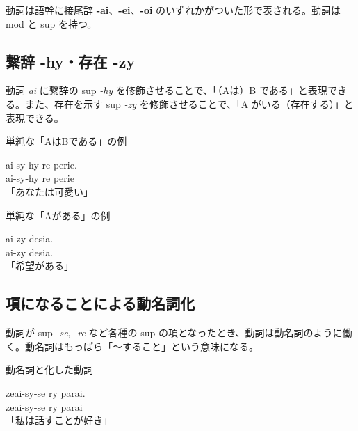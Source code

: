 動詞は語幹に接尾辞 \textbf{-ai}、\textbf{-ei}、\textbf{-oi} のいずれかがついた形で表される。動詞は mod と sup を持つ。

\subsection{繋辞 -hy・存在 -zy}

動詞 \emph{ai} に繋辞の sup \emph{-hy} を修飾させることで、「（Aは）B である」と表現できる。また、存在を示す sup \emph{-zy} を修飾させることで、「A がいる（存在する）」と表現できる。

\begin{itembox}[l]{単純な「AはBである」の例}
    \begin{pindent}
        \noindent
        ai-sy-hy re perie. \\
        ai-sy-hy
            re perie \\
        「あなたは可愛い」
    \end{pindent}
\end{itembox}

\begin{itembox}[l]{単純な「Aがある」の例}
    \begin{pindent}
        \noindent
        ai-zy desia. \\
        ai-zy desia.\\
        「希望がある」
    \end{pindent}
\end{itembox}

\subsection{項になることによる動名詞化}

動詞が sup \emph{-se}, \emph{-re} など各種の sup の項となったとき、動詞は動名詞のように働く。動名詞はもっぱら「～すること」という意味になる。

\begin{itembox}[l]{動名詞と化した動詞}
    \begin{pindent}
        \noindent
        zeai-sy-se ry parai. \\
        zeai-sy-se
            ry parai \\
        「私は話すことが好き」
    \end{pindent}
\end{itembox}

